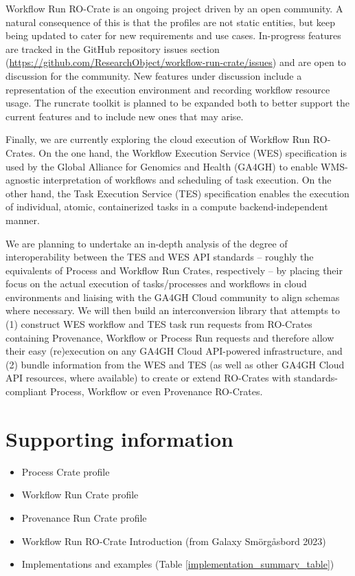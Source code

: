 \documentclass[10pt,letterpaper]{article}
\begin{document}
Workflow Run RO-Crate is an ongoing project driven by an open community.
A natural consequence of this is that the profiles are not static entities, but keep being updated to cater for new requirements and use cases.
In-progress features are tracked in the GitHub repository issues section (\url{https://github.com/ResearchObject/workflow-run-crate/issues}) and are open to discussion for the community.
New features under discussion include a representation of the execution environment and recording workflow resource usage.
The runcrate toolkit is planned to be expanded both to better support the current features and to include new ones that may arise.

Finally, we are currently exploring the cloud execution of Workflow Run RO-Crates.
On the one hand, the Workflow Execution Service (WES) specification is used by the Global Alliance for Genomics and Health (GA4GH) \cite{Rehm 2021} to enable WMS-agnostic interpretation of workflows and scheduling of task execution. On the other hand, the Task Execution Service (TES) specification enables the execution of individual, atomic, containerized tasks in a compute backend-independent manner.

We are planning to undertake an in-depth analysis of the degree of interoperability between the TES and WES API standards -- roughly the equivalents of Process and Workflow Run Crates, respectively -- by placing their focus on the actual execution of tasks/processes and workflows in cloud environments and liaising with the GA4GH Cloud community to align schemas where necessary.
We will then build an interconversion library that attempts to (1) construct WES workflow and TES task run requests from RO-Crates containing Provenance, Workflow or Process Run requests and therefore allow their easy (re)execution on any GA4GH Cloud API-powered infrastructure, and (2) bundle information from the WES and TES (as well as other GA4GH Cloud API resources, where available) to create or extend RO-Crates with standards-compliant Process, Workflow or even Provenance RO-Crates.



\section*{Supporting information}

\begin{itemize}
    \item Process Crate profile \cite{WRROC 2023a}
    \item Workflow Run Crate profile \cite{WRROC 2023b}
    \item Provenance Run Crate profile \cite{WRROC 2023c}
    \item Workflow Run RO-Crate Introduction \cite{runcrate-intro} (from Galaxy Smörgåsbord 2023) 
    \item Implementations and examples (Table \ref{implementation_summary_table})
\end{itemize}
\end{document}
